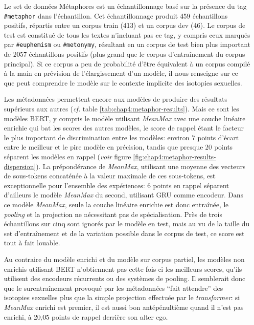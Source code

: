 Le set de données Métaphores est un échantillonnage basé sur la présence du tag \texttt{\#metaphor} dans l'échantillon. Cet échantillonnage produit 459 échantillons positifs, répartis entre un corpus train (413) et un corpus dev (46). Le corpus de test est constitué de tous les textes n'incluant pas ce tag, y compris ceux marqués par \texttt{\#euphemism} ou \texttt{\#metonymy}, résultant en un corpus de test bien plus important de 2057 échantillons positifs (plus grand que le corpus d'entraînement du corpus principal). Si ce corpus a peu de probabilité d'être équivalent à un corpus compilé à la main en prévision de l'élargissement d'un modèle, il nous renseigne sur ce que peut comprendre le modèle sur le contexte implicite des isotopies sexuelles.

Les métadonnées permettent encore aux modèles de produire des résultats supérieurs aux autres (\textit{cf.} table \ref{tab:chap4:metaphor-results}). Mais ce sont les modèles BERT, y compris le modèle utilisant \textit{MeanMax} avec une couche linéaire enrichie qui bat les scores des autres modèles, le score de rappel étant le facteur le plus important de discrimination entre les modèles: environ 7 points d'écart entre le meilleur et le pire modèle en précision, tandis que presque 20 points séparent les modèles en rappel (\textit{voir} figure \ref{fig:chap4:metaphor-results-dispersion}). La prépondérance de \textit{MeanMax}, utilisant une moyenne des vecteurs de sous-tokens concaténée à la valeur maximale de ces sous-tokens, est exceptionnelle pour l'ensemble des expériences: 6 points en rappel séparent d'ailleurs le modèle \textit{MeanMax} du second, utilisant GRU comme encodeur. Dans ce modèle \textit{MeanMax}, seule la couche linéaire enrichie est donc entraînée, le \textit{pooling} et la projection ne nécessitant pas de spécialisation. Près de trois échantillons sur cinq sont ignorés par le modèle en test, mais au vu de la taille du set d'entraînement et de la variation possible dans le corpus de test, ce score est tout à fait louable.

Au contraire du modèle enrichi et du modèle sur corpus partiel, les modèles non enrichis utilisant BERT n'obtiennent pas cette fois-ci les meilleurs scores, qu'ils utilisent des encodeurs récurrents ou des systèmes de pooling. Il semblerait donc que le surentraînement provoqué par les métadonnées ``fait attendre'' des isotopies sexuelles plus que la simple projection effectuée par le \textit{transformer}: si \textit{MeanMax} enrichi est premier, il est aussi bon antépénultième quand il n'est pas enrichi, à 20,05 points de rappel derrière son alter ego.

